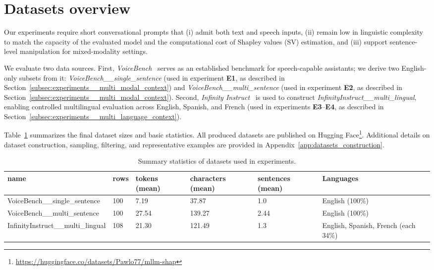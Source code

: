 \section{Datasets overview}
\label{subsec:experiments__datasets}

Our experiments require short conversational prompts that (i) admit both text and speech inputs, (ii) remain low in linguistic complexity to match the capacity of the evaluated model and the computational cost of Shapley values (SV) estimation, and (iii) support sentence-level manipulation for mixed-modality settings.

We evaluate two data sources. First, \textit{VoiceBench}~\parencite{chen2024voicebench} serves as an established benchmark for speech-capable assistants; we derive two English-only subsets from it: \textit{VoiceBench\_\_single\_sentence} (used in experiment \textbf{E1}, as described in Section~\ref{subsec:experiments__multi_modal_context}) and \textit{VoiceBench\_\_multi\_sentence} (used in experiment \textbf{E2}, as described in Section~\ref{subsec:experiments__multi_modal_context}). Second, \textit{Infinity Instruct}~\parencite{li2025infinityinstruct} is used to construct \textit{InfinityInstruct\_\_multi\_lingual}, enabling controlled multilingual evaluation across English, Spanish, and French (used in experiments \textbf{E3}--\textbf{E4}, as described in Section~\ref{subsec:experiments__multi_language_context}).

Table~\ref{tab:experiments__datasets__summary} summarizes the final dataset sizes and basic statistics. All produced datasets are published on Hugging Face\footnote{\url{https://huggingface.co/datasets/Pawlo77/mllm-shap}}. Additional details on dataset construction, sampling, filtering, and representative examples are provided in Appendix~\ref{app:datasets_construction}.

\begin{table}[h!]
\centering
\caption{Summary statistics of datasets used in experiments.}
\begin{tabular}{p{5.3cm} p{0.8cm} p{1.2cm} p{1.7cm} p{1.7cm} p{2.8cm}}
\toprule
\textbf{name} & \textbf{rows} & \textbf{tokens (mean)} & \textbf{characters (mean)} & \textbf{sentences (mean)} & \textbf{Languages} \\
\midrule
VoiceBench\_\_single\_sentence & 100 & 7.19  & 37.87  & 1.0  & English (100\%) \\
VoiceBench\_\_multi\_sentence  & 100 & 27.54 & 139.27 & 2.44 & English (100\%) \\
InfinityInstruct\_\_multi\_lingual & 108 & 21.30 & 121.49 & 1.3 & English, Spanish, French (each 34\%) \\
\bottomrule
\end{tabular}
\label{tab:experiments__datasets__summary}
\end{table}

